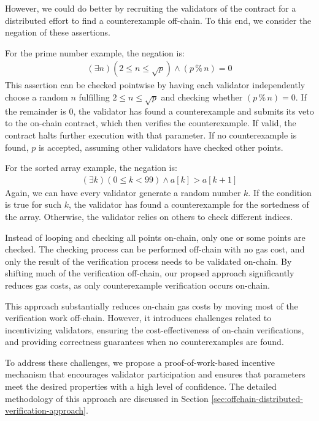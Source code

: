 \documentclass[runningheads]{llncs}
\begin{document}
However, we could do better by recruiting the validators of the contract for a distributed effort to find a counterexample off-chain. To this end, we consider the negation of these assertions. 

For the prime number example, the negation is:
\begin{gather*}\label{}
  (\exists n) (2 \leq n \leq \sqrt{p}) \wedge (p \mathbin{\%} n) = 0
\end{gather*}
This assertion can be checked pointwise by having each validator independently choose a random \(n\) fulfilling \(2 \leq n \leq \sqrt{p}\) and checking whether \((p \mathbin{\%} n) = 0\). If the remainder is \(0\), the validator has found a counterexample and submits its veto to the on-chain contract, which then verifies the counterexample. If valid, the contract halts further execution with that parameter. If no counterexample is found, \(p\) is accepted, assuming other validators have checked other points.

For the sorted array example, the negation is:
\begin{gather*}\label{}
  (\exists k) (0\leq k <99) \wedge a[k] > a[k+1]
\end{gather*}
Again, we can have every validator generate a random number \(k\). If the condition is true for such \(k\), the validator has found a counterexample for the sortedness of the array. Otherwise, the validator relies on others to check different indices.

Instead of looping and checking all points on-chain, only one or some points are checked. The checking process can be performed off-chain with no gas cost, and only the result of the verification process needs to be validated on-chain. By shifting much of the verification off-chain, our propsed approach significantly reduces gas costs, as only counterexample verification occurs on-chain.

This approach substantially reduces on-chain gas costs by moving most of the verification work off-chain. However, it introduces challenges related to incentivizing validators, ensuring the cost-effectiveness of on-chain verifications, and providing correctness guarantees when no counterexamples are found.

To address these challenges, we propose a proof-of-work-based incentive mechanism that encourages validator participation and ensures that parameters meet the desired properties with a high level of confidence. The detailed methodology of this approach are discussed in Section \ref{sec:offchain-distributed-verification-approach}.
\end{document}
